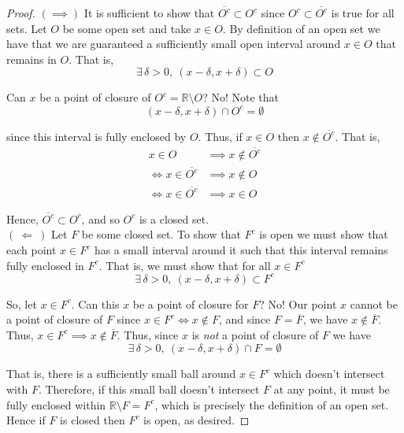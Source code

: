 \documentclass[12pt]{article}
\newlength\tindent
\renewcommand{\indent}{\hspace*{\tindent}}
\newcommand{\R}{\mathbb R}
\newcommand{\limplies}{~\Longleftarrow ~} %
\newcommand{\rimplies}{\implies} %
\begin{document}
\begin{proof} $(\implies)$ It is sufficient to show that $\overline{O^c} \subset O^c$ since $O^c \subset \overline{O^c}$ is true for all sets. Let $O$ be some open set and take $x \in O$. By definition of an open set we have that we are guaranteed a sufficiently small open interval around $x \in O$ that remains in $O$. That is,
\begin{equation*}
	\exists\,\delta > 0,~ (x - \delta, x + \delta) \subset O
\end{equation*}

Can $x$ be a point of closure of $O^c = \R \setminus O$? No! Note that
\begin{equation*}
	(x - \delta, x + \delta) \cap O^c = \emptyset
\end{equation*}

since this interval is fully enclosed by $O$. Thus, if $x \in O$ then $x \notin \overline{O^c}$. That is,
\begin{align*}
	x \in O &\implies x \notin \overline{O^c}  \\
	\iff x \in \overline{O^c} &\implies x \notin O \\
	\iff x \in \overline{O^c} &\implies x \in O
\end{align*}

Hence, $\overline{O^c} \subset O^c$, and so $O^c$ is a closed set. \\

$(\limplies)$ Let $F$ be some closed set. To show that $F^c$ is open we must show that each point $x \in F^c$ has a small interval around it such that this interval remains fully enclosed in $F^c$. That is, we must show that for all $x \in F^c$
\begin{equation*}
	\exists\,\delta > 0,~ (x - \delta, x + \delta) \subset F^c
\end{equation*}

\indent So, let $x \in F^c$. Can this $x$ be a point of closure for $F$? No! Our point $x$ cannot be a point of closure of $F$ since $x \in F^c \iff x \notin F$, and since $F = \overline{F}$, we have $x \notin \overline{F}$. Thus, $x \in F^c \implies x \notin \overline{F}$. Thus, since $x$ is {\em not} a point of closure of $F$ we have
\begin{equation*}
	\exists\,\delta > 0,~(x - \delta, x + \delta) \cap F = \emptyset
\end{equation*}

\indent That is, there is a sufficiently small ball around $x \in F^c$ which doesn't intersect with $F$. Therefore, if this small ball doesn't intersect $F$ at any point, it must be fully enclosed within $\R \setminus F = F^c$, which is precisely the definition of an open set. Hence if $F$ is closed then $F^c$ is open, as desired.

\end{proof}
\end{document}
